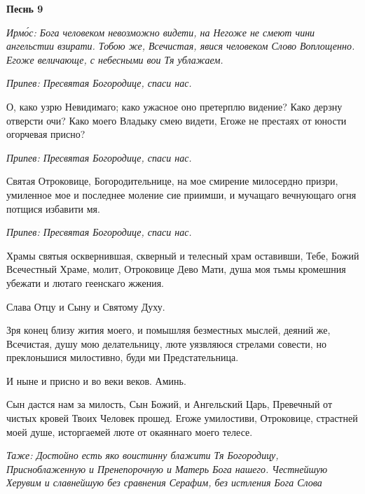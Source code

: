 \bfseries Песнь 9\normalfont{}


 \itshape Ирмо́с:\normalfont{} Бога человеком невозможно видети, на Негоже не смеют чини
ангельстии взирати. Тобою же, Всечистая, явися человеком Слово Воплощенно.
Егоже величающе, с небесными вои Тя ублажаем.



 \itshape Припев:\normalfont{} Пресвятая Богородице, спаси нас.



   О, како узрю Невидимаго; како ужасное оно претерплю видение? Како
дерзну отверсти очи? Како моего Владыку смею видети, Егоже не престаях
от юности огорчевая присно?



 \itshape Припев:\normalfont{} Пресвятая Богородице, спаси нас.



   Святая Отроковице, Богородительнице, на мое смирение милосердно
призри, умиленное мое и последнее моление сие приимши, и мучащаго
вечнующаго огня потщися избавити мя.



 \itshape Припев:\normalfont{} Пресвятая Богородице, спаси нас.



   Храмы святыя осквернившая, скверный и телесный храм оставивши,
Тебе, Божий Всечестный Храме, молит, Отроковице Дево Мати, душа моя
тьмы кромешния убежати и лютаго геенскаго жжения.



   Слава Отцу и Сыну и Святому Духу.



   Зря конец близу жития моего, и помышляя безместных мыслей, деяний
же, Всечистая, душу мою делательницу, люте уязвляюся стрелами совести,
но преклоньшися милостивно, буди ми Предстательница.



   И ныне и присно и во веки веков. Аминь.



   Сын дастся нам за милость, Сын Божий, и Ангельский Царь,
Превечный от чистых кровей Твоих Человек прошед. Егоже умилостиви,
Отроковице, страстней моей душе, исторгаемей люте от окаяннаго моего
телесе.



 \itshape Таже:\normalfont{} Достойно есть яко воистинну блажити Тя Богородицу,
Присноблаженную и Пренепорочную и Матерь Бога нашего. Честнейшую
Херувим и славнейшую без сравнения Серафим, без истления Бога Слова

